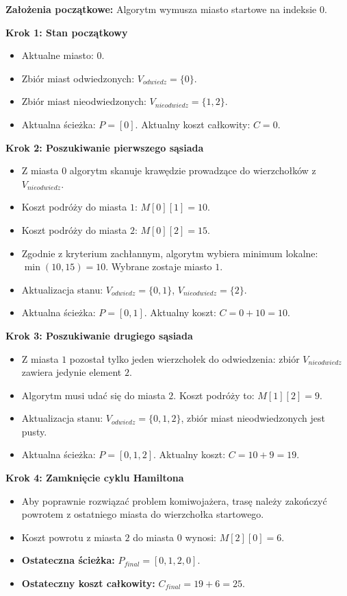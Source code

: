 \documentclass[12pt, a4paper]{article}
\begin{document}
	\textbf{Założenia początkowe:}
	Algorytm wymusza miasto startowe na indeksie $0$.
	
	\textbf{Krok 1: Stan początkowy}
	\begin{itemize}
		\item Aktualne miasto: $0$.
		\item Zbiór miast odwiedzonych: $V_{odwiedz} = \{0\}$.
		\item Zbiór miast nieodwiedzonych: $V_{nieodwiedz} = \{1, 2\}$.
		\item Aktualna ścieżka: $P = [0]$. Aktualny koszt całkowity: $C = 0$.
	\end{itemize}
	
	\textbf{Krok 2: Poszukiwanie pierwszego sąsiada}
	\begin{itemize}
		\item Z miasta $0$ algorytm skanuje krawędzie prowadzące do wierzchołków z $V_{nieodwiedz}$.
		\item Koszt podróży do miasta $1$: $M[0][1] = 10$.
		\item Koszt podróży do miasta $2$: $M[0][2] = 15$.
		\item Zgodnie z kryterium zachłannym, algorytm wybiera minimum lokalne: $\min(10, 15) = 10$. Wybrane zostaje miasto $1$.
		\item Aktualizacja stanu: $V_{odwiedz} = \{0, 1\}$, $V_{nieodwiedz} = \{2\}$.
		\item Aktualna ścieżka: $P = [0, 1]$. Aktualny koszt: $C = 0 + 10 = 10$.
	\end{itemize}
	
	\textbf{Krok 3: Poszukiwanie drugiego sąsiada}
	\begin{itemize}
		\item Z miasta $1$ pozostał tylko jeden wierzchołek do odwiedzenia: zbiór $V_{nieodwiedz}$ zawiera jedynie element $2$.
		\item Algorytm musi udać się do miasta $2$. Koszt podróży to: $M[1][2] = 9$.
		\item Aktualizacja stanu: $V_{odwiedz} = \{0, 1, 2\}$, zbiór miast nieodwiedzonych jest pusty.
		\item Aktualna ścieżka: $P = [0, 1, 2]$. Aktualny koszt: $C = 10 + 9 = 19$.
	\end{itemize}
	
	\textbf{Krok 4: Zamknięcie cyklu Hamiltona}
	\begin{itemize}
		\item Aby poprawnie rozwiązać problem komiwojażera, trasę należy zakończyć powrotem z ostatniego miasta do wierzchołka startowego.
		\item Koszt powrotu z miasta $2$ do miasta $0$ wynosi: $M[2][0] = 6$.
		\item \textbf{Ostateczna ścieżka:} $P_{final} = [0, 1, 2, 0]$.
		\item \textbf{Ostateczny koszt całkowity:} $C_{final} = 19 + 6 = 25$.
	\end{itemize}
	
\end{document}
